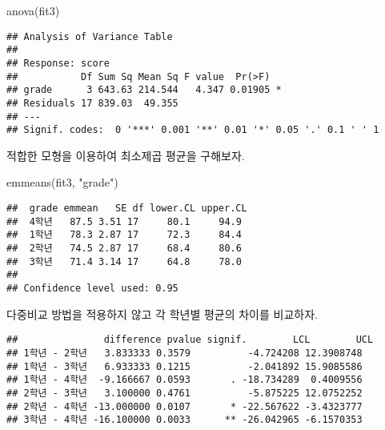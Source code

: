 \documentclass[
]{book}
\newenvironment{Shaded}{\begin{snugshade}}{\end{snugshade}}
\newcommand{\AttributeTok}[1]{\textcolor[rgb]{0.77,0.63,0.00}{#1}}
\newcommand{\ConstantTok}[1]{\textcolor[rgb]{0.00,0.00,0.00}{#1}}
\newcommand{\FloatTok}[1]{\textcolor[rgb]{0.00,0.00,0.81}{#1}}
\newcommand{\FunctionTok}[1]{\textcolor[rgb]{0.00,0.00,0.00}{#1}}
\newcommand{\NormalTok}[1]{#1}
\newcommand{\OtherTok}[1]{\textcolor[rgb]{0.56,0.35,0.01}{#1}}
\newcommand{\SpecialCharTok}[1]{\textcolor[rgb]{0.00,0.00,0.00}{#1}}
\newcommand{\StringTok}[1]{\textcolor[rgb]{0.31,0.60,0.02}{#1}}
\begin{document}
\begin{Shaded}
\begin{Highlighting}[]
\FunctionTok{anova}\NormalTok{(fit3)}
\end{Highlighting}
\end{Shaded}

\begin{verbatim}
## Analysis of Variance Table
## 
## Response: score
##           Df Sum Sq Mean Sq F value  Pr(>F)  
## grade      3 643.63 214.544   4.347 0.01905 *
## Residuals 17 839.03  49.355                  
## ---
## Signif. codes:  0 '***' 0.001 '**' 0.01 '*' 0.05 '.' 0.1 ' ' 1
\end{verbatim}

적합한 모형을 이용하여 최소제곱 평균을 구해보자.

\begin{Shaded}
\begin{Highlighting}[]
\FunctionTok{emmeans}\NormalTok{(fit3, }\StringTok{"grade"}\NormalTok{)}
\end{Highlighting}
\end{Shaded}

\begin{verbatim}
##  grade emmean   SE df lower.CL upper.CL
##  4학년   87.5 3.51 17     80.1     94.9
##  1학년   78.3 2.87 17     72.3     84.4
##  2학년   74.5 2.87 17     68.4     80.6
##  3학년   71.4 3.14 17     64.8     78.0
## 
## Confidence level used: 0.95
\end{verbatim}

다중비교 방법을 적용하지 않고 각 학년별 평균의 차이를 비교하자.

\begin{Shaded}
\end{Shaded}

\begin{verbatim}
##               difference pvalue signif.        LCL        UCL
## 1학년 - 2학년   3.833333 0.3579          -4.724208 12.3908748
## 1학년 - 3학년   6.933333 0.1215          -2.041892 15.9085586
## 1학년 - 4학년  -9.166667 0.0593       . -18.734289  0.4009556
## 2학년 - 3학년   3.100000 0.4761          -5.875225 12.0752252
## 2학년 - 4학년 -13.000000 0.0107       * -22.567622 -3.4323777
## 3학년 - 4학년 -16.100000 0.0033      ** -26.042965 -6.1570353
\end{verbatim}
\end{document}
